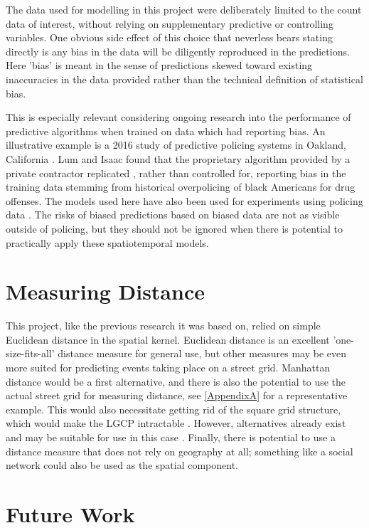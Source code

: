  The data used for modelling in this project were deliberately limited to the count data of interest, without relying on supplementary predictive or controlling variables.  One obvious side effect of this choice that neverless bears stating directly is any bias in the data will be diligently reproduced in the predictions. Here 'bias' is meant in the sense of predictions skewed toward existing inaccuracies in the data provided rather than the technical definition of statistical bias.\par

This is especially relevant considering ongoing research into the performance of predictive algorithms when trained on data which had reporting bias. An illustrative example is a 2016 study of predictive policing systems in Oakland, California \cite{lum2016predict}. Lum and Isaac found that the proprietary algorithm provided by a private contractor replicated , rather than controlled for, reporting bias in the training data stemming from historical overpolicing of black Americans for drug offenses. The models used here have also been used for experiments using policing data \cite{flaxman_2014} \cite{flaxman_2018}. The risks of biased predictions based on biased data are not as visible outside of policing, but they should not be ignored when there is potential to practically apply these spatiotemporal models.

\section{Measuring Distance}

This project, like the previous research it was based on, relied on simple Euclidean distance in the spatial kernel. Euclidean distance is an excellent 'one-size-fits-all' distance measure for general use, but other measures may be even more suited for predicting events taking place on a street grid. Manhattan distance would be a first alternative, and there is also the potential to use the actual street grid for measuring distance, see \ref{AppendixA} for a representative example. This would also necessitate getting rid of the square grid structure, which would make the LGCP intractable \cite{teng_2017}. However, alternatives already exist and may be suitable for use in this case \cite{simpson2016going}. Finally, there is potential to use a distance measure that does not rely on geography at all; something like a social network could also be used as the spatial component.


\section{Future Work}

